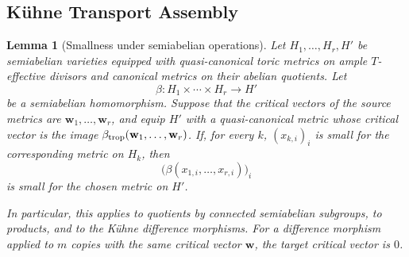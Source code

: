 \documentclass[10pt,a4paper]{amsart}
\theoremstyle{plain}
\newtheorem{lemma}[theorem]{Lemma}
\theoremstyle{plain}
\numberwithin{equation}{section}
\begin{document}
\subsection{K\"uhne Transport Assembly}
\label{subsec:kuhne-transport-assembly}

\begin{lemma}[Smallness under semiabelian operations]
	\label{lem:qcanonical-operation-smallness}
	Let \(H_1,\ldots,H_r,H'\) be semiabelian varieties equipped with
	quasi-canonical toric metrics on ample \(T\)-effective divisors and canonical
	metrics on their abelian quotients.  Let
	\[
	\beta:H_1\times\cdots\times H_r\longrightarrow H'
	\]
	be a semiabelian homomorphism.  Suppose that the critical vectors of the source
	metrics are \(\mathbf w_1,\ldots,\mathbf w_r\), and equip \(H'\) with a
	quasi-canonical metric whose critical vector is the image
	\(\beta_{\rm trop}(\mathbf w_1,\ldots,\mathbf w_r)\).  If, for every \(k\),
	\((x_{k,i})_i\) is small for the corresponding metric on \(H_k\), then
	\[
	\bigl(\beta(x_{1,i},\ldots,x_{r,i})\bigr)_i
	\]
	is small for the chosen metric on \(H'\).
	
	In particular, this applies to quotients by connected semiabelian subgroups,
	to products, and to the K\"uhne difference morphisms.  For a difference
	morphism applied to \(m\) copies with the same critical vector \(\mathbf w\),
	the target critical vector is \(0\).
\end{lemma}
\end{document}
